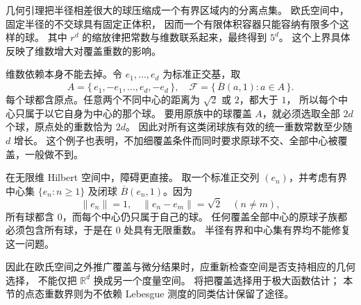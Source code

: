 几何引理把半径相差很大的球压缩成一个有界区域内的分离点集。
欧氏空间中，固定半径的不交球具有固定正体积，
因而一个有限体积容器只能容纳有限多个这样的球。
其中 \(r^d\) 的缩放律把常数与维数联系起来，最终得到 \(5^d\)。
这个上界具体反映了维数增大对覆盖重数的影响。

\ProseParagraphBreak

维数依赖本身不能去掉。令 \(e_1,\ldots,e_d\) 为标准正交基，取
\[
 A=\{\,e_1,-e_1,\ldots,e_d,-e_d\,\},
 \quad
 \mathcal F=\{\,\overline B(a,1):a\in A\,\}.
\]
每个球都含原点。任意两个不同中心的距离为 \(\sqrt2\) 或 \(2\)，都大于 \(1\)，
所以每个中心只属于以它自身为中心的那个球。
要用原族中的球覆盖 \(A\)，就必须选取全部 \(2d\) 个球，原点处的重数恰为 \(2d\)。
因此对所有这类闭球族有效的统一重数常数至少随 \(d\) 增长。
这个例子也表明，不加细覆盖条件而同时要求原球不交、全部中心被覆盖，一般做不到。

\ProseParagraphBreak

在无限维 Hilbert 空间中，障碍更直接。
取一个标准正交列 \((e_n)\)，并考虑有界中心集 \(\{e_n:n\geq1\}\) 及闭球
\(\overline B(e_n,1)\)。因为
\[
 \|e_n\|=1,\quad \|e_n-e_m\|=\sqrt2\quad(n\ne m),
\]
所有球都含 \(0\)，而每个中心仍只属于自己的球。
任何覆盖全部中心的原球子族都必须包含所有球，于是在 \(0\) 处具有无限重数。
半径有界和中心集有界均不能修复这一问题。

\ProseParagraphBreak

因此在欧氏空间之外推广覆盖与微分结果时，应重新检查空间是否支持相应的几何选择，
不能仅把 \(\mathbb R^d\) 换成另一个度量空间。
将把覆盖选择用于极大函数估计；
本节的点态重数界则为不依赖 Lebesgue 测度的同类估计保留了途径。
